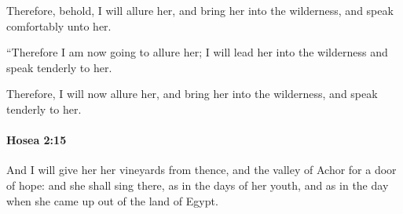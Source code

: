 			\begin{versebox}
					\item[BHS] 
					\item[LXX] 
					\item[ASV] Therefore, behold, I will allure her, and bring her into the wilderness, and speak comfortably unto her.
					\item[NIV] “Therefore I am now going to allure her; I will lead her into the wilderness and speak tenderly to her.
					\item[NRSV] Therefore, I will now allure her, and bring her into the wilderness, and speak tenderly to her.
			\end{versebox}

		\paragraph{Hosea 2:15} %
			\label{HOSEA-2-15}

			And I will give her her vineyards from thence, and the valley of Achor for a door of hope: and she shall sing there, as in the days of her youth, and as in the day when she came up out of the land of Egypt.

